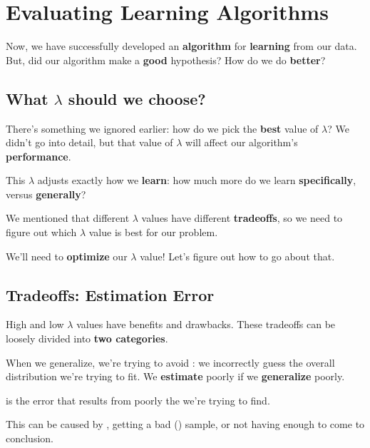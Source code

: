         
        
    
\pagebreak
        
\section{Evaluating Learning Algorithms}

    Now, we have successfully developed an \textbf{algorithm} for \textbf{learning} from our data. But, did our algorithm make a \textbf{good} hypothesis? How do we do \textbf{better}?
    
    \subsection{What $\lambda$ should we choose?}
    
        There's something we ignored earlier: how do we pick the \textbf{best} value of $\lambda$? We didn't go into detail, but that value of $\lambda$ will affect our algorithm's \textbf{performance}.
        
        This $\lambda$ adjusts exactly how we \textbf{learn}: how much more do we learn \textbf{specifically}, versus \textbf{generally}?
    
        We mentioned that different $\lambda$ values have different \textbf{tradeoffs}, so we need to figure out which $\lambda$ value is best for our problem.
        
        We'll need to \textbf{optimize} our $\lambda$ value! Let's figure out how to go about that.
        
    \subsection{Tradeoffs: Estimation Error}
    
        High and low $\lambda$ values have benefits and drawbacks. These tradeoffs can be loosely divided into \textbf{two categories}.
        
        When we generalize, we're trying to avoid : we incorrectly guess the overall distribution we're trying to fit. We \textbf{estimate} poorly if we \textbf{generalize} poorly.\\
        
        \begin{definition}
             is the error that results from poorly  the  we're trying to find. 
            
            This can be caused by , getting a bad () sample, or not having enough  to come to conclusion.
        \end{definition}
        
